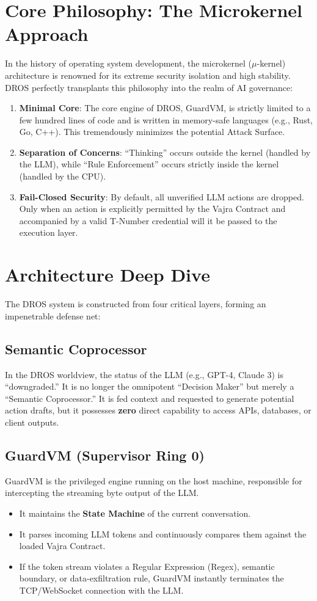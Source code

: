 \documentclass[conference]{IEEEtran}
\begin{document}
\section{Core Philosophy: The Microkernel Approach}
In the history of operating system development, the microkernel ($\mu$-kernel) architecture is renowned for its extreme security isolation and high stability. DROS perfectly transplants this philosophy into the realm of AI governance:

\begin{enumerate}
    \item \textbf{Minimal Core}: The core engine of DROS, GuardVM, is strictly limited to a few hundred lines of code and is written in memory-safe languages (e.g., Rust, Go, C++). This tremendously minimizes the potential Attack Surface.
    \item \textbf{Separation of Concerns}: ``Thinking'' occurs outside the kernel (handled by the LLM), while ``Rule Enforcement'' occurs strictly inside the kernel (handled by the CPU).
    \item \textbf{Fail-Closed Security}: By default, all unverified LLM actions are dropped. Only when an action is explicitly permitted by the Vajra Contract and accompanied by a valid T-Number credential will it be passed to the execution layer.
\end{enumerate}

\section{Architecture Deep Dive}
The DROS system is constructed from four critical layers, forming an impenetrable defense net:

\subsection{Semantic Coprocessor}
In the DROS worldview, the status of the LLM (e.g., GPT-4, Claude 3) is ``downgraded.'' It is no longer the omnipotent ``Decision Maker'' but merely a ``Semantic Coprocessor.'' It is fed context and requested to generate potential action drafts, but it possesses \textbf{zero} direct capability to access APIs, databases, or client outputs.

\subsection{GuardVM (Supervisor Ring 0)}
GuardVM is the privileged engine running on the host machine, responsible for intercepting the streaming byte output of the LLM.
\begin{itemize}
    \item It maintains the \textbf{State Machine} of the current conversation.
    \item It parses incoming LLM tokens and continuously compares them against the loaded Vajra Contract.
    \item If the token stream violates a Regular Expression (Regex), semantic boundary, or data-exfiltration rule, GuardVM instantly terminates the TCP/WebSocket connection with the LLM.
\end{itemize}
\end{document}
